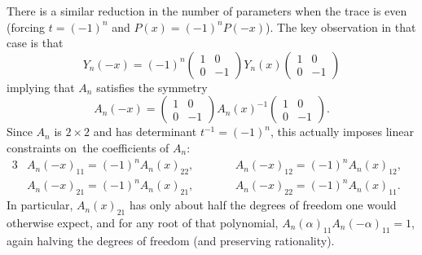 \documentclass[10pt,a4paper]{amsart}
\theoremstyle{definition}
\numberwithin{equation}{section}
\begin{document}
There is a similar reduction in the number of parameters when the trace is
even (forcing $t=(-1)^n$ and $P(x)=(-1)^n P(-x)$). The key observation in that case
is that
\[
Y_n(-x) = (-1)^n \begin{pmatrix} 1 & 0 \\ 0 & -1\end{pmatrix}Y_n(x)
 \begin{pmatrix} 1 & 0 \\ 0 & -1\end{pmatrix}
\]
implying that $A_n$ satisfies the symmetry
\[
A_n(-x)
=
\begin{pmatrix} 1 & 0 \\ 0 & -1\end{pmatrix}
A_n(x)^{-1}
\begin{pmatrix} 1 & 0 \\ 0 & -1\end{pmatrix} .
\]
Since $A_n$ is $2\times 2$ and has determinant $t^{-1}=(-1)^n$, this actually
imposes linear constraints on~the coefficients of $A_n$:
\begin{alignat*}{3}
&A_n(-x)_{11} = (-1)^n A_n(x)_{22},\qquad&&
A_n(-x)_{12} = (-1)^n A_n(x)_{12},&\\
&A_n(-x)_{21} = (-1)^n A_n(x)_{21},\qquad&&
A_n(-x)_{22} = (-1)^n A_n(x)_{11}.&
\end{alignat*}
In particular, $A_n(x)_{21}$ has only about half the degrees of freedom one
would otherwise expect, and for any root of that polynomial,
$A_n(\alpha)_{11}A_n(-\alpha)_{11}=1$, again halving the degrees of freedom (and
preserving rationality).
\end{document}
